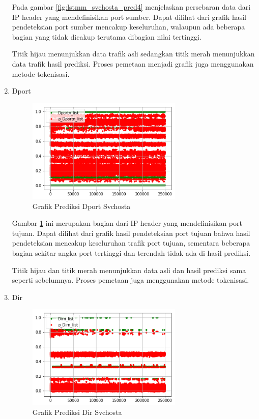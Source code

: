 \documentclass[./skripsi.tex]{subfiles}
\begin{document}
\begin{enumerate}
    \par Pada gambar \ref{fig:lstmm_svchosta_pred4} menjelaskan persebaran data dari IP header yang mendefinisikan port sumber. Dapat dilihat dari grafik hasil pendeteksian port sumber mencakup keseluruhan, walaupun ada beberapa bagian yang tidak dicakup terutama dibagian nilai tertinggi.
    \par Titik hijau menunjukkan data trafik asli sedangkan titik merah menunjukkan data trafik hasil prediksi. Proses pemetaan menjadi grafik juga menggunakan metode tokenisasi.
    
    \item Dport
    \begin{figure}%
        \centering
        \includegraphics[width=0.7\textwidth]{public/assets/img/lstmm_svchosta_pred5.png}
        \caption{Grafik Prediksi Dport Svchosta}
        \label{fig:lstmm_svchosta_pred5}
    \end{figure}
    
    \par Gambar \ref{fig:lstmm_svchosta_pred5} ini merupakan bagian dari IP header yang mendefinisikan port tujuan. Dapat dilihat dari grafik hasil pendeteksian port tujuan bahwa hasil pendeteksian mencakup keseluruhan trafik port tujuan, sementara beberapa bagian sekitar angka port tertinggi dan terendah tidak ada di hasil prediksi.
    \par Titik hijau dan titik merah menunjukkan data asli dan hasil prediksi sama seperti sebelumnya. Proses pemetaan juga menggunakan metode tokenisasi.
    
    \item Dir
    \begin{figure}%
        \centering
        \includegraphics[width=0.7\textwidth]{public/assets/img/lstmm_svchosta_pred6.png}
        \caption{Grafik Prediksi Dir Svchosta}
        \label{fig:lstmm_svchosta_pred6}
    \end{figure}
    

\end{enumerate}
\end{document}
